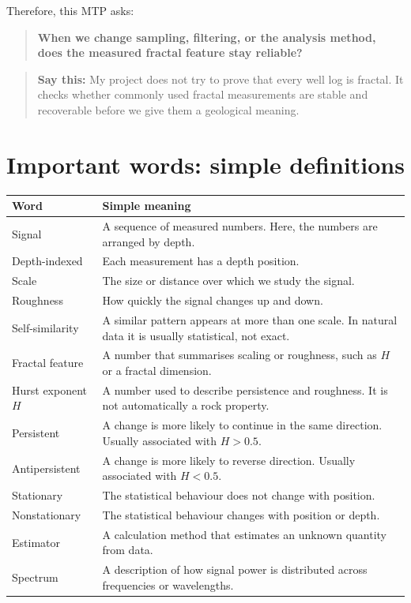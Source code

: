 \documentclass[11pt,a4paper]{article}
\newcommand{\say}[1]{\begin{quote}\color{Navy}\textbf{Say this:} #1\end{quote}}
\begin{document}
Therefore, this MTP asks:

\begin{quote}\textbf{When we change sampling, filtering, or the analysis method, does the measured fractal feature stay reliable?}\end{quote}

\say{My project does not try to prove that every well log is fractal. It checks whether commonly used fractal measurements are stable and recoverable before we give them a geological meaning.}

\section{Important words: simple definitions}
\begin{tabular}{>{\raggedright\arraybackslash}p{} p{}}
\toprule
\textbf{Word} & \textbf{Simple meaning}\\
\midrule
Signal & A sequence of measured numbers. Here, the numbers are arranged by depth.\\
Depth-indexed & Each measurement has a depth position.\\
Scale & The size or distance over which we study the signal.\\
Roughness & How quickly the signal changes up and down.\\
Self-similarity & A similar pattern appears at more than one scale. In natural data it is usually statistical, not exact.\\
Fractal feature & A number that summarises scaling or roughness, such as $H$ or a fractal dimension.\\
Hurst exponent $H$ & A number used to describe persistence and roughness. It is not automatically a rock property.\\
Persistent & A change is more likely to continue in the same direction. Usually associated with $H>0.5$.\\
Antipersistent & A change is more likely to reverse direction. Usually associated with $H<0.5$.\\
Stationary & The statistical behaviour does not change with position.\\
Nonstationary & The statistical behaviour changes with position or depth.\\
Estimator & A calculation method that estimates an unknown quantity from data.\\
Spectrum & A description of how signal power is distributed across frequencies or wavelengths.\\

\end{tabular}
\end{document}
